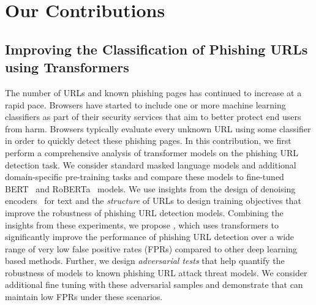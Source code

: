 \section{Our Contributions}

\subsection{Improving the Classification of Phishing URLs using Transformers}
The number of URLs and known phishing pages has continued to increase at a rapid pace.
Browsers have started to include one or more machine learning classifiers as part of their security services that aim to better protect end users from harm.
Browsers typically evaluate every unknown URL using some classifier in order to quickly detect these phishing pages.
In this contribution, we first perform a comprehensive analysis of transformer models on the phishing URL detection task.
We consider standard masked language models and additional domain-specific pre-training tasks and compare these models to fine-tuned BERT~\citep{devlin2019bert} and RoBERTa~\citep{liu2019roberta} models.
We use insights from the design of denoising encoders~\cite{lewis2020bart,clark2020electra} for text and the \textit{structure} of URLs to design training objectives that improve the robustness of phishing URL detection models.
Combining the insights from these experiments, we propose \URLTranSys, which uses transformers to significantly improve the performance of phishing URL detection over a wide range of very low false positive rates (FPRs) compared to other deep learning based methods.
Further, we design \textit{adversarial tests} that help quantify the robustness of models to known phishing URL attack threat models. 
We consider additional fine tuning with these adversarial samples and demonstrate that \URLTranSys can maintain low FPRs under these scenarios.

